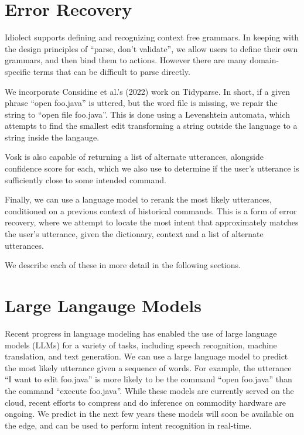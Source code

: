\documentclass[conference]{IEEEtran}
\begin{document}
\section{Error Recovery}

Idiolect supports defining and recognizing context free grammars. In keeping with the design principles of ``parse, don't validate'', we allow users to define their own grammars, and then bind them to actions. However there are many domain-specific terms that can be difficult to parse directly.

We incorporate Considine et al.'s (2022) work on Tidyparse. In short, if a given phrase ``open foo.java'' is uttered, but the word file is missing, we repair the string to ``open file foo.java''. This is done using a Levenshtein automata, which attempts to find the smallest edit transforming a string outside the language to a string inside the langauge.

Vosk is also capable of returning a list of alternate utterances, alongside confidence score for each, which we also use to determine if the user's utterance is sufficiently close to some intended command.

Finally, we can use a language model to rerank the most likely utterances, conditioned on a previous context of historical commands. This is a form of error recovery, where we attempt to locate the most intent that approximately matches the user's utterance, given the dictionary, context and a list of alternate utterances.

We describe each of these in more detail in the following sections.

\section{Large Langauge Models}

Recent progress in language modeling has enabled the use of large language models (LLMs) for a variety of tasks, including speech recognition, machine translation, and text generation. We can use a large language model to predict the most likely utterance given a sequence of words. For example, the utterance ``I want to edit foo.java'' is more likely to be the command ``open foo.java'' than the command ``execute foo.java''. While these models are currently served on the cloud, recent efforts to compress and do inference on commodity hardware are ongoing. We predict in the next few years these models will soon be available on the edge, and can be used to perform intent recognition in real-time.
\end{document}
